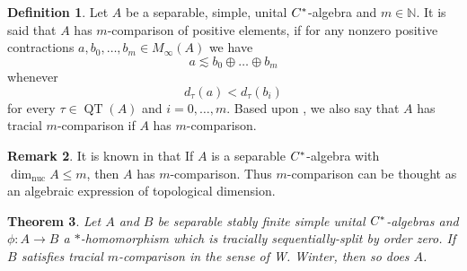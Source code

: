\documentclass[12pt]{amsart}
\theoremstyle{plain}
\newtheorem{thm}{Theorem}[section]
\theoremstyle{definition}
\newtheorem{defn}[thm]{Definition}
\newtheorem{rem}[thm]{Remark}
\def\dim{\operatorname{dim}}
\def\QT{\operatorname{QT}}
\def\nuc{\operatorname{nuc}}
\numberwithin{equation}{section}
\begin{document}
\begin{defn}\cite[Definition 2.1-(i)]{W}
Let $A$ be a separable, simple, unital $C\sp*$-algebra and $m\in \mathbb{N}$. 
It is said that $A$ has $m$-comparison of positive elements, if for any nonzero positive contractions $a, b_0, \dots, b_m \in M_{\infty}(A)$ we have 
\[ a \lesssim b_0 \oplus \dots \oplus b_m\] 
whenever 
\[ d_{\tau} (a) < d_{\tau}(b_i) \]  
for every $\tau \in \QT(A)$ and $i=0, \dots, m$. Based upon \cite[Proposition 2.3]{W}, we also say that $A$ has tracial $m$-comparison if $A$ has $m$-comparison. 
\end{defn}
\begin{rem}
It is known  in \cite[Theorem 1]{Le} that If $A$ is a separable $C\sp*$-algebra with $\dim_{\nuc}A \le  m$, then $A$
has $m$-comparison. Thus $m$-comparison can be thought as an algebraic expression of topological dimension. 
\end{rem}
 \begin{thm}\label{T:m-comparison}
Let $A$ and $B$ be  separable stably finite simple unital $C\sp*$-algebras and $\phi: A \to B $ a $*$-homomorphism which is tracially sequentially-split by order zero. If $B$ satisfies  tracial $m$-comparison in the sense of W. Winter, then so does $A$.   
\end{thm}
\end{document}
